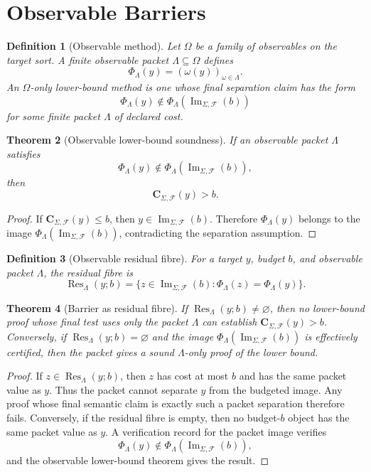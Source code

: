 \documentclass[11pt]{article}
\newtheorem{theorem}{Theorem}[section]
\newtheorem{definition}[theorem]{Definition}
\begin{document}
\section{Observable Barriers}

\begin{definition}[Observable method]
Let \(\Omega\) be a family of observables on the target sort.  A finite observable packet \(\Lambda\subseteq\Omega\) defines
\[
\Phi_{\Lambda}(y)=(\omega(y))_{\omega\in\Lambda}.
\]
An \(\Omega\)-only lower-bound method is one whose final separation claim has the form
\[
\Phi_{\Lambda}(y)\notin \Phi_{\Lambda}(\operatorname{Im}_{\Sigma,\mathcal F}(b))
\]
for some finite packet \(\Lambda\) of declared cost.
\end{definition}

\begin{theorem}[Observable lower-bound soundness]
If an observable packet \(\Lambda\) satisfies
\[
\Phi_{\Lambda}(y)\notin \Phi_{\Lambda}(\operatorname{Im}_{\Sigma,\mathcal F}(b)),
\]
then
\[
\mathbf C_{\Sigma,\mathcal F}(y)>b.
\]
\end{theorem}

\begin{proof}
If \(\mathbf C_{\Sigma,\mathcal F}(y)\le b\), then \(y\in\operatorname{Im}_{\Sigma,\mathcal F}(b)\).  Therefore \(\Phi_{\Lambda}(y)\) belongs to the image \(\Phi_{\Lambda}(\operatorname{Im}_{\Sigma,\mathcal F}(b))\), contradicting the separation assumption.
\end{proof}

\begin{definition}[Observable residual fibre]
For a target \(y\), budget \(b\), and observable packet \(\Lambda\), the residual fibre is
\[
\operatorname{Res}_{\Lambda}(y;b)
=
\{z\in\operatorname{Im}_{\Sigma,\mathcal F}(b):
\Phi_{\Lambda}(z)=\Phi_{\Lambda}(y)\}.
\]
\end{definition}

\begin{theorem}[Barrier as residual fibre]
If \(\operatorname{Res}_{\Lambda}(y;b)\ne\varnothing\), then no lower-bound proof whose final test uses only the packet \(\Lambda\) can establish \(\mathbf C_{\Sigma,\mathcal F}(y)>b\).  Conversely, if \(\operatorname{Res}_{\Lambda}(y;b)=\varnothing\) and the image \(\Phi_{\Lambda}(\operatorname{Im}_{\Sigma,\mathcal F}(b))\) is effectively certified, then the packet gives a sound \(\Lambda\)-only proof of the lower bound.
\end{theorem}

\begin{proof}
If \(z\in\operatorname{Res}_{\Lambda}(y;b)\), then \(z\) has cost at most \(b\) and has the same packet value as \(y\).  Thus the packet cannot separate \(y\) from the budgeted image.  Any proof whose final semantic claim is exactly such a packet separation therefore fails.  Conversely, if the residual fibre is empty, then no budget-\(b\) object has the same packet value as \(y\).  A verification record for the packet image verifies
\[
\Phi_{\Lambda}(y)\notin \Phi_{\Lambda}(\operatorname{Im}_{\Sigma,\mathcal F}(b)),
\]
and the observable lower-bound theorem gives the result.
\end{proof}
\end{document}
